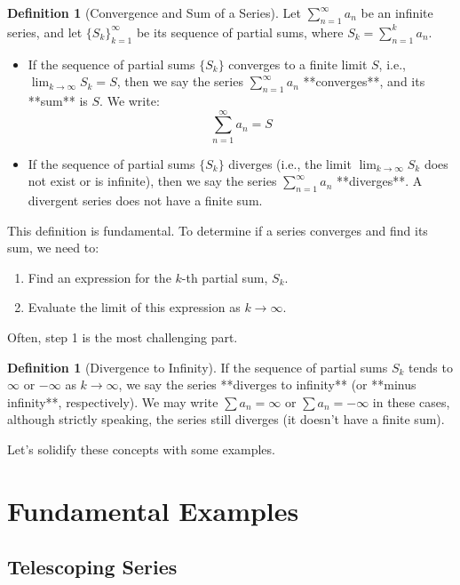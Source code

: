 \documentclass[11pt]{article}
\theoremstyle{definition}
\newtheorem{definition}[theorem]{Definition}
\theoremstyle{remark}
\begin{document}
\begin{definition}[Convergence and Sum of a Series]
Let $\sum_{n=1}^{\infty} a_n$ be an infinite series, and let $\{S_k\}_{k=1}^{\infty}$ be its sequence of partial sums, where $S_k = \sum_{n=1}^{k} a_n$.
\begin{itemize}
    \item If the sequence of partial sums $\{S_k\}$ converges to a finite limit $S$, i.e., $\lim_{k \to \infty} S_k = S$, then we say the series $\sum_{n=1}^{\infty} a_n$ **converges**, and its **sum** is $S$. We write:
    \[ \sum_{n=1}^{\infty} a_n = S \]
    \item If the sequence of partial sums $\{S_k\}$ diverges (i.e., the limit $\lim_{k \to \infty} S_k$ does not exist or is infinite), then we say the series $\sum_{n=1}^{\infty} a_n$ **diverges**. A divergent series does not have a finite sum.
\end{itemize}
\end{definition}

This definition is fundamental. To determine if a series converges and find its sum, we need to:
\begin{enumerate}
    \item Find an expression for the $k$-th partial sum, $S_k$.
    \item Evaluate the limit of this expression as $k \to \infty$.
\end{enumerate}
Often, step 1 is the most challenging part.

\begin{definition}[Divergence to Infinity]
If the sequence of partial sums $S_k$ tends to $\infty$ or $-\infty$ as $k \to \infty$, we say the series **diverges to infinity** (or **minus infinity**, respectively). We may write $\sum a_n = \infty$ or $\sum a_n = -\infty$ in these cases, although strictly speaking, the series still diverges (it doesn't have a finite sum).
\end{definition}

Let's solidify these concepts with some examples.

\section{Fundamental Examples}

\subsection{Telescoping Series}
\end{document}
